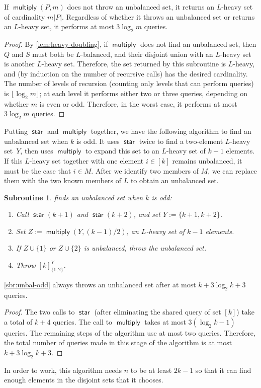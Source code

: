 \documentclass[11pt]{llncs}
\newcommand{\starsub}{\operatorname{\mathsf{star}}}
\newcommand{\multsub}{\operatorname{\mathsf{multiply}}}
\newcommand{\assign}{:=}
\newtheorem{subroutine}{Subroutine}
\begin{document}
\ifFull
\begin{lemma}
If $\multsub(P,m)$ does not throw an unbalanced set, it returns an $L$-heavy set of cardinality $m|P|$. Regardless of whether it throws an unbalanced set or returns an $L$-heavy set, it performs at most $3\log_2 m$ queries.
\end{lemma}
\begin{proof}
\fi
By \autoref{lem:heavy-doubling}, if $\multsub$ does not find an unbalanced set, then $Q$ and $S$ must both be $L$-balanced, and their disjoint union with an $L$-heavy set is another $L$-heavy set. Therefore, the set returned by this subroutine is $L$-heavy, and
(by induction on the number of recursive calls)
has the desired cardinality. The number of levels of recursion (counting only levels that can perform queries) is $\lfloor\log_2 m\rfloor$; at each level it performs either two or three queries, depending on whether $m$ is even or odd. Therefore, in the worst case, it performs at most $3\log_2 m$ queries.
\ifFull
\end{proof}
\fi

Putting $\starsub$ and $\multsub$ together, we have the following algorithm to find an unbalanced set when $k$ is odd. It uses $\starsub$ twice to find a two-element $L$-heavy set~$Y$, then uses $\multsub$ to expand this set to an $L$-heavy set of $k-1$ elements.
If this $L$-heavy set together with one element $i\in [k]$ remains unbalanced, it must be the case that $i\in M$. After we identify two members of $M$, we can replace them with the two known members of $L$ to obtain an unbalanced set.

\begin{subroutine} finds an unbalanced set when $k$ is odd:
\label{sbr:unbal-odd}
\begin{enumerate}
\item Call $\starsub(k+1)$ and $\starsub(k+2)$, and set $Y\assign\{k+1,k+2\}$.
\item Set $Z\assign\multsub(Y,(k-1)/2)$, an $L$-heavy set of $k-1$ elements.
\item If $Z\cup\{1\}$ or $Z\cup\{2\}$ is unbalanced, throw the unbalanced set.
\item Throw $[k]_{\{1,2\}}^Y$.
\end{enumerate}
\end{subroutine}

\ifFull
\begin{lemma}
\autoref{sbr:unbal-odd} always throws an unbalanced set after at most $k+3\log_2 k+3$ queries.
\end{lemma}
\begin{proof}
\fi
The two calls to $\starsub$ (after eliminating the shared query of set $[k]$) take a total of $k+4$ queries. The call to $\multsub$ takes at most $3(\log_2 k - 1)$ queries. The remaining steps of the algorithm use at most two queries. Therefore, the total number of queries made in this stage of the algorithm is at most $k+3\log_2 k+3$.
\ifFull
\end{proof}
\fi
In order to work, this algorithm needs $n$ to be at least $2k-1$ so that it can find enough elements in the disjoint sets that it chooses.
\end{document}
